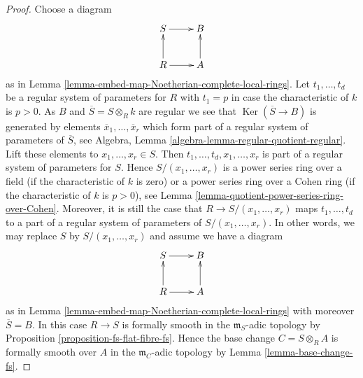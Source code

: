 \documentclass[10pt,a4paper]{amsart}
\theoremstyle{plain}
\theoremstyle{definition}
\theoremstyle{remark}
\numberwithin{equation}{subsection}
\def\Ker{\mathop{\mathrm{Ker}}}
\begin{document}
\begin{proof}
Choose a diagram
$$
\xymatrix{
S \ar[r] & B \\
R \ar[u] \ar[r] & A \ar[u]
}
$$
as in Lemma \ref{lemma-embed-map-Noetherian-complete-local-rings}.
Let $t_1, \ldots, t_d$ be a regular system of parameters for $R$
with $t_1 = p$ in case the characteristic of $k$ is $p > 0$.
As $B$ and $\overline{S} = S \otimes_R k$
are regular we see that $\Ker(\overline{S} \to B)$ is generated by
elements $\overline{x}_1, \ldots, \overline{x}_r$ which form part of a
regular system of parameters of $\overline{S}$, see
Algebra, Lemma \ref{algebra-lemma-regular-quotient-regular}.
Lift these elements to $x_1, \ldots, x_r \in S$. Then
$t_1, \ldots, t_d, x_1, \ldots, x_r$ is part of a regular system of
parameters for $S$. Hence $S/(x_1, \ldots, x_r)$ is a power
series ring over a field (if the characteristic of $k$ is zero)
or a power series ring over a Cohen ring (if the characteristic of
$k$ is $p > 0$), see
Lemma \ref{lemma-quotient-power-series-ring-over-Cohen}.
Moreover, it is still the case that $R \to S/(x_1, \ldots, x_r)$
maps $t_1, \ldots, t_d$ to a part of a regular system of parameters
of $S/(x_1, \ldots, x_r)$. In other words, we may replace $S$ by
$S/(x_1, \ldots, x_r)$ and assume we have a diagram
$$
\xymatrix{
S \ar[r] & B \\
R \ar[u] \ar[r] & A \ar[u]
}
$$
as in Lemma \ref{lemma-embed-map-Noetherian-complete-local-rings}
with moreover $\overline{S} = B$. In this case $R \to S$ is
formally smooth in the $\mathfrak m_S$-adic topology by
Proposition \ref{proposition-fs-flat-fibre-fs}.
Hence the base change $C = S \otimes_R A$ is formally smooth
over $A$ in the $\mathfrak m_C$-adic topology by
Lemma \ref{lemma-base-change-fs}.
\end{proof}
\end{document}
